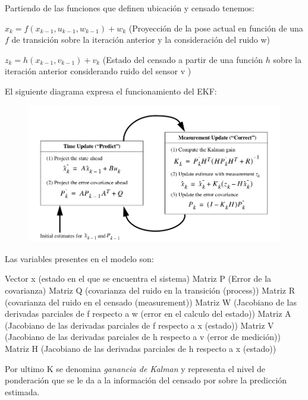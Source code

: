 Partiendo de las funciones que definen ubicación y censado tenemos:

$x_k = f(x_{k-1}, u_{k-1},w_{k-1}) + w_k$  (Proyección de la pose actual en función de una $f$ de transición sobre la iteración anterior y la consideración del ruido w)

$z_k = h(x_{k-1},v_{k-1}) + v_k$   (Estado del censado a partir de una función $h$ sobre la iteración anterior considerando ruido del sensor v )

El siguiente diagrama expresa el funcionamiento del EKF:


\begin{center}
\begin{figure}[!htb]
\includegraphics[width=\linewidth]{KalmanEsquema.png}
\end{figure}
\FloatBarrier
\end{center}

Las variables presentes en el modelo son: 

Vector x (estado en el que se encuentra el sistema)
Matriz P (Error de la covarianza)
Matriz Q (covarianza del ruido en la transición (process))
Matriz R (covarianza del ruido en el censado (measurement))
Matriz W (Jacobiano de las derivadas parciales de f respecto a w (error en el calculo del estado))
Matriz A (Jacobiano de las derivadas parciales de f respecto a x (estado))
Matriz V (Jacobiano de las derivadas parciales de h respecto a v (error de medición))
Matriz H (Jacobiano de las derivadas parciales de h respecto a x (estado))
 
Por ultimo K se denomina \textit{ganancia de Kalman} y representa el nivel de ponderación que se le da a la información del censado por sobre la predicción estimada.

